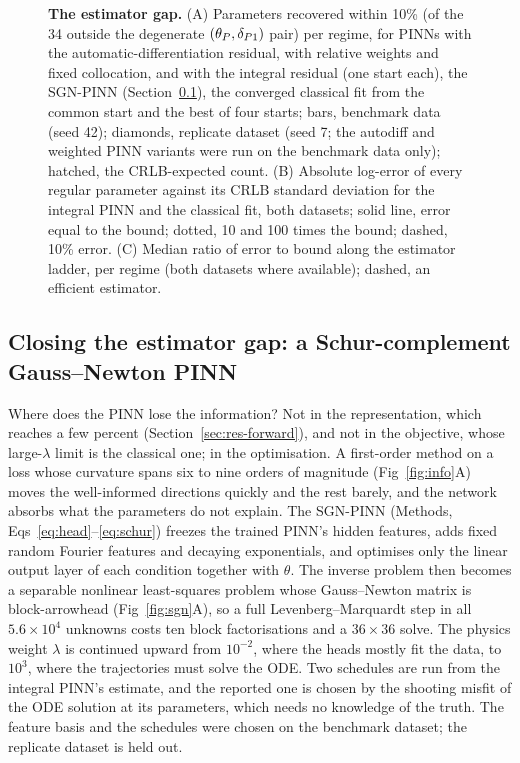 \begin{figure}[tbp]
\centering
{}
\caption{\textbf{The estimator gap.} (A) Parameters recovered within 10\% (of the
34 outside the degenerate $(\theta_P,\delta_{P1})$ pair) per regime, for PINNs with the
automatic-differentiation residual, with relative weights and fixed
collocation, and with the integral residual (one start each), the SGN-PINN
(Section~\ref{sec:res-sgn}), the converged classical fit from the common start
and the best of four starts; bars, benchmark data (seed 42); diamonds,
replicate dataset (seed 7; the autodiff and weighted PINN variants were run on
the benchmark data only); hatched, the CRLB-expected count. (B) Absolute
log-error of every regular parameter against its CRLB standard deviation for
the integral PINN and the classical fit, both datasets; solid line, error equal
to the bound; dotted, 10 and 100 times the bound; dashed, 10\% error. (C) Median
ratio of error to bound along the estimator ladder, per regime (both datasets
where available); dashed, an
efficient estimator.}
\label{fig:gap}
\end{figure}

\subsection{Closing the estimator gap: a Schur-complement Gauss--Newton PINN}
\label{sec:res-sgn}

Where does the PINN lose the information? Not in the representation, which
reaches a few percent (Section~\ref{sec:res-forward}), and not in the objective,
whose large-$\lambda$ limit is the classical one; in the optimisation. A
first-order method on a loss whose curvature spans six to nine orders of magnitude
(Fig~\ref{fig:info}A) moves the well-informed directions quickly and the rest
barely, and the network absorbs what the parameters do not explain. The
SGN-PINN (Methods, Eqs~\eqref{eq:head}--\eqref{eq:schur}) freezes the trained
PINN's hidden features, adds fixed random Fourier features and decaying
exponentials, and optimises only the linear output layer of each condition
together with $\theta$. The inverse problem then becomes a separable nonlinear
least-squares problem whose Gauss--Newton matrix is block-arrowhead
(Fig~\ref{fig:sgn}A), so a full Levenberg--Marquardt step in all
$5.6\times10^4$ unknowns costs ten block factorisations and a $36\times36$
solve. The physics weight $\lambda$ is continued upward from $10^{-2}$, where the
heads mostly fit the data, to $10^3$, where the trajectories must solve the
ODE. Two schedules are run from the integral PINN's estimate, and the reported
one is chosen by the shooting misfit of the ODE solution at its parameters,
which needs no knowledge of the truth. The feature basis and the schedules
were chosen on the benchmark dataset; the replicate dataset is held out.

